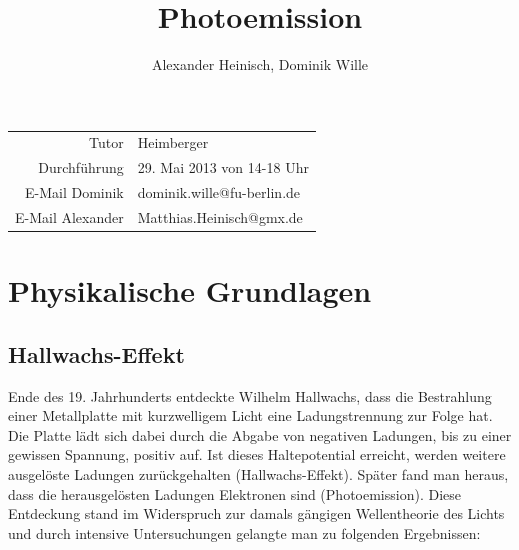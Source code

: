 \documentclass{article}
\title{Photoemission}
\author{Alexander Heinisch, Dominik Wille}
\begin{document}
\maketitle

\begin{center}
\begin{minipage}{\linewidth}
\centering
{}
\label{wtd}
\end{minipage}
\end{center}

\vspace{7cm}
\noindent
\begin{center}
\begin{tabular}{r l}
Tutor & Heimberger\\
Durchführung & 29. Mai 2013 von 14-18 Uhr \\

E-Mail Dominik & dominik.wille@fu-berlin.de \\
E-Mail Alexander & Matthias.Heinisch@gmx.de \\
\end{tabular}
\end{center}

\newpage
\tableofcontents
\newpage

\section{Physikalische Grundlagen}

\subsection{Hallwachs-Effekt}
Ende des 19. Jahrhunderts entdeckte Wilhelm Hallwachs, dass die Bestrahlung einer Metallplatte mit kurzwelligem Licht eine Ladungstrennung zur Folge hat. Die Platte lädt sich dabei durch die Abgabe von negativen Ladungen, bis zu einer gewissen Spannung, positiv auf. Ist dieses Haltepotential erreicht, werden weitere ausgelöste Ladungen zurückgehalten (Hallwachs-Effekt). Später fand man heraus, dass die herausgelösten Ladungen Elektronen sind (Photoemission).
Diese Entdeckung stand im Widerspruch zur damals gängigen Wellentheorie des Lichts und durch intensive Untersuchungen gelangte man zu folgenden Ergebnissen:
\end{document}
